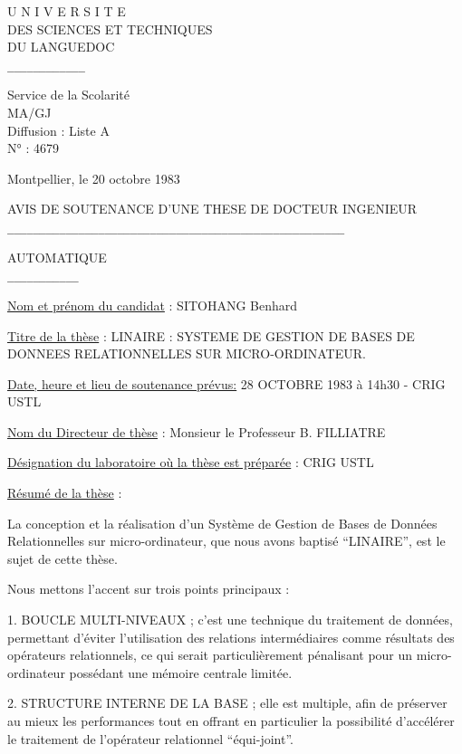 
\begin{center}
U N I V E R S I T E\\
DES SCIENCES ET TECHNIQUES\\
DU LANGUEDOC\\
\texttt{\_\_\_\_\_\_\_\_\_\_\_\_}

Service de la Scolarité\\
MA/GJ\\
Diffusion : Liste A\\
N° : 4679
\end{center}

Montpellier, le 20 octobre 1983

\begin{center}
AVIS DE SOUTENANCE D'UNE THESE DE DOCTEUR INGENIEUR\\
\texttt{\_\_\_\_\_\_\_\_\_\_\_\_\_\_\_\_\_\_\_\_\_\_\_\_\_\_\_\_\_\_\_\_\_\_\_\_\_\_\_\_\_\_\_\_\_\_\_\_\_\_\_\_}

AUTOMATIQUE\\
\texttt{\_\_\_\_\_\_\_\_\_\_\_}
\end{center}

\uline{Nom et prénom du candidat} : SITOHANG Benhard

\uline{Titre de la thèse} : LINAIRE : SYSTEME DE GESTION DE BASES DE DONNEES RELATIONNELLES SUR MICRO-ORDINATEUR.

\uline{Date, heure et lieu de soutenance prévus:} 28 OCTOBRE 1983 à 14h30 - CRIG USTL

\uline{Nom du Directeur de thèse} : Monsieur le Professeur B. FILLIATRE

\uline{Désignation du laboratoire où la thèse est préparée} : CRIG USTL

\uline{Résumé de la thèse} :

La conception et la réalisation d'un Système de Gestion de Bases de Données Relationnelles sur micro-ordinateur, que nous avons baptisé ``LINAIRE'', est le sujet de cette thèse.

Nous mettons l'accent sur trois points principaux :

1. BOUCLE MULTI-NIVEAUX ; c'est une technique du traitement de données, permettant d'éviter l'utilisation des relations intermédiaires comme résultats des opérateurs relationnels, ce qui serait particulièrement pénalisant pour un micro-ordinateur possédant une mémoire centrale limitée.

2. STRUCTURE INTERNE DE LA BASE ; elle est multiple, afin de préserver au mieux les performances tout en offrant en particulier la possibilité d'accélérer le traitement de l'opérateur relationnel ``équi-joint''.

